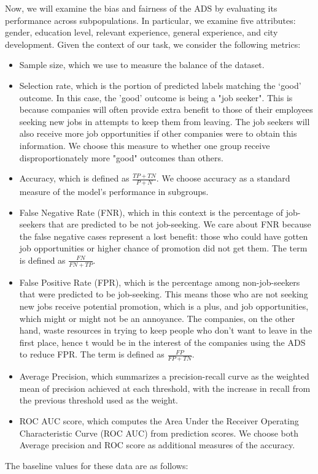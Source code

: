 Now, we will examine the bias and fairness of the ADS by evaluating its performance across subpopulations. In particular, we examine five attributes: gender, education level, relevant experience, general experience, and city development. Given the context of our task, we consider the following metrics:
\begin{itemize}
\item Sample size, which we use to measure the balance of the dataset.
\item Selection rate, which is the portion of predicted labels matching the ‘good’ outcome. In this case, the 'good' outcome is being a "job seeker". This is because companies will often provide extra benefit to those of their employees seeking new jobs in attempts to keep them from leaving. The job seekers will also receive more job opportunities if other companies were to obtain this information. We choose this measure to whether one group receive disproportionately more "good" outcomes than others.
\item Accuracy, which is defined as $\frac{TP + TN}{P + N}$. We choose accuracy as a standard measure of the model's performance in subgroups. 
\item False Negative Rate (FNR), which in this context is the percentage of job-seekers that are predicted to be not job-seeking. We care about FNR because the false negative cases represent a lost benefit: those who could have gotten job opportunities or higher chance of promotion did not get them. The term is defined as $\frac{FN}{FN + TP}$.
\item False Positive Rate (FPR), which is the percentage among non-job-seekers that were predicted to be job-seeking. This means those who are not seeking new jobs receive potential promotion, which is a plus, and job opportunities, which might or might not be an annoyance. The companies, on the other hand, waste resources in trying to keep people who don't want to leave in the first place, hence t would be in the interest of the companies using the ADS to reduce FPR. The term is defined as $\frac{FP}{FP + TN}$.
\item Average Precision, which summarizes a precision-recall curve as the weighted mean of precision achieved at each threshold, with the increase in recall from the previous threshold used as the weight.
\item ROC AUC score, which computes the Area Under the Receiver Operating Characteristic Curve (ROC AUC) from prediction scores. We choose both Average precision and ROC score as additional measures of the accuracy. 
\end{itemize}
The baseline values for these data are as follows:


